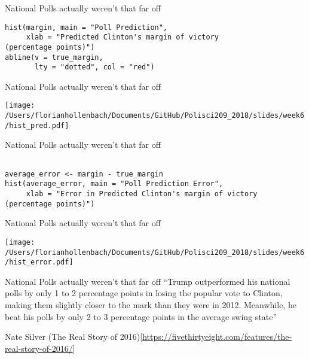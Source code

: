 \documentclass[presentation]{beamer}
\begin{document}
\begin{frame}[fragile,shrink=25,label={sec:org75a29e5}]{National Polls actually weren't that far off}
 \begin{verbatim}
hist(margin, main = "Poll Prediction",
     xlab = "Predicted Clinton's margin of victory
(percentage points)")
abline(v = true_margin,
       lty = "dotted", col = "red")
\end{verbatim}
\end{frame}




\begin{frame}[label={sec:orge4a685e}]{National Polls actually weren't that far off}
\begin{center}
\texttt{[image: /Users/florianhollenbach/Documents/GitHub/Polisci209\_2018/slides/week6/hist\_pred.pdf]}
\end{center}
\end{frame}

\begin{frame}[fragile,label={sec:org82f9c3d}]{National Polls actually weren't that far off}
 \begin{verbatim}

average_error <- margin - true_margin
hist(average_error, main = "Poll Prediction Error",
     xlab = "Error in Predicted Clinton's margin of victory
(percentage points)")
\end{verbatim}
\end{frame}


\begin{frame}[label={sec:org2129c30}]{National Polls actually weren't that far off}
\begin{center}
\texttt{[image: /Users/florianhollenbach/Documents/GitHub/Polisci209\_2018/slides/week6/hist\_error.pdf]}
\end{center}
\end{frame}


\begin{frame}[label={sec:org8f1529f}]{National Polls actually weren't that far off}
``Trump outperformed his national polls by only 1 to 2 percentage points in losing the popular vote to Clinton, making them slightly closer to the mark than they were in 2012. Meanwhile, he beat his polls by only 2 to 3 percentage points in the average swing state''

\alert{Nate Silver} (The Real Story of 2016)[\url{https://fivethirtyeight.com/features/the-real-story-of-2016/}]
\end{frame}
\end{document}

